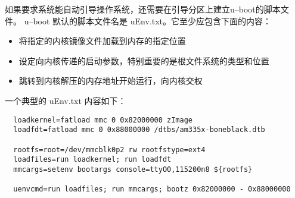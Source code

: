 如果要求系统能自动引导操作系统，还需要在引导分区上建立u--boot的脚本文件。
u--boot 默认的脚本文件名是 uEnv.txt。它至少应包含下面的内容：
\begin{itemize}
  \item 将指定的内核镜像文件加载到内存的指定位置
  \item 设定向内核传递的启动参数，特别重要的是根文件系统的类型和位置
  \item 跳转到内核解压的内存地址开始运行，向内核交权
\end{itemize}

一个典型的 uEnv.txt 内容如下：
\begin{verbatim}
  loadkernel=fatload mmc 0 0x82000000 zImage
  loadfdt=fatload mmc 0 0x88000000 /dtbs/am335x-boneblack.dtb

  rootfs=root=/dev/mmcblk0p2 rw rootfstype=ext4
  loadfiles=run loadkernel; run loadfdt
  mmcargs=setenv bootargs console=ttyO0,115200n8 ${rootfs}

  uenvcmd=run loadfiles; run mmcargs; bootz 0x82000000 - 0x88000000
\end{verbatim}

